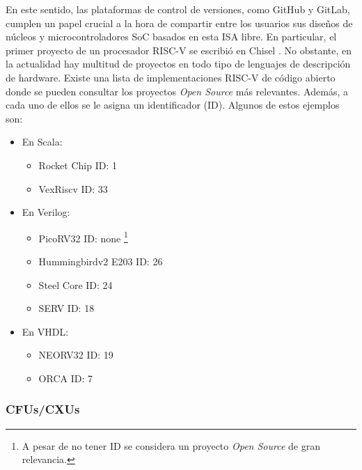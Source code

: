 En este sentido, las plataformas de control de versiones, como GitHub y GitLab, cumplen un papel crucial a la hora de compartir entre los usuarios sus diseños de núcleos y microcontroladores SoC basados en esta ISA libre.
En particular, el primer proyecto de un procesador RISC-V se escribió en Chisel \cite{bachrach:2012:chisel}.
No obstante, en la actualidad hay multitud de proyectos en todo tipo de lenguajes de descripción de hardware.
Existe una lista de implementaciones RISC-V de código abierto \cite{marchid} donde se pueden consultar los proyectos \textit{Open Source} más relevantes.
Además, a cada uno de ellos se le asigna un identificador (ID).
Algunos de estos ejemplos son:

\begin{itemize}
    \item En Scala:
        \begin{itemize}
            \item Rocket Chip \cite{gh:rocket-chip} ID: 1
            \item VexRiscv \cite{gh:VexRiscv} ID: 33
        \end{itemize}
    \item En Verilog:
        \begin{itemize}
            \item PicoRV32 \cite{gh:picorv32} ID: none \footnote{A pesar de no tener ID se considera un proyecto \textit{Open Source} de gran relevancia.}
            \item Hummingbirdv2 E203 \cite{gh:e203-hbirdv2} ID: 26
            \item Steel Core \cite{gh:riscv-steel} ID: 24
            \item SERV \cite{gh:serv} ID: 18
        \end{itemize}
    \item En VHDL:
        \begin{itemize}
            \item NEORV32 \cite{gh:neorv32} ID: 19
            \item ORCA \cite{gh:ORCA-risc-v} ID: 7
        \end{itemize}
\end{itemize} 

\subsubsection{CFUs/CXUs}

